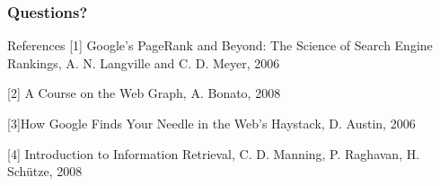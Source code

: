\documentclass{beamer}
\begin{document}
\begin{frame}
\frametitle{Questions?}
\begin{block}{References}
[1] Google’s PageRank and Beyond: The Science of Search Engine Rankings, A. N. Langville and C. D. Meyer, 2006

[2] A Course on the Web Graph, A. Bonato, 2008

[3]How Google Finds Your Needle in the Web’s Haystack, D. Austin, 2006 

[4] Introduction to Information Retrieval, C. D. Manning, P. Raghavan, H. Sch\"utze, 2008 \end{block}
\end{frame}
\end{document}
